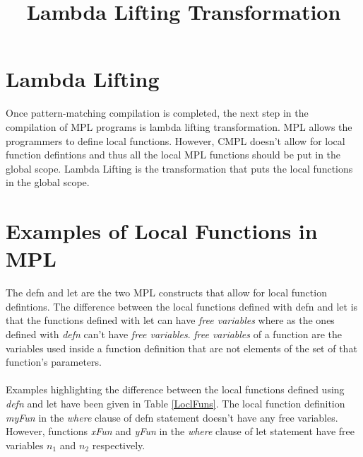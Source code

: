 \documentclass[11pt]{article}
\title{Lambda Lifting Transformation}
\begin{document}
\maketitle
\section {Lambda Lifting} 
Once pattern-matching compilation is completed, the next step in the compilation of MPL programs is lambda lifting transformation. MPL allows the programmers to define local functions. However, CMPL doesn't allow for local function defintions and thus all the local MPL functions should be put in the global scope. Lambda Lifting is the transformation that puts the local functions in the global scope.

\section {Examples of Local Functions in MPL}


The {\sf defn} and {\sf let} are the two MPL constructs that allow for local function defintions. The difference between the local functions defined with {\sf defn} and {\sf let} is that the functions defined with {\sf let} can have {\em free variables} where as the ones defined with {\em defn} can't have {\em free variables}. {\em free variables} of a function are the variables used inside a function definition that are not elements of the set of that function's parameters. 
~~\\~~\\ 
Examples highlighting the difference between the local functions defined using {\em defn} and {\sf let} have been given in Table \ref {LoclFuns}. The local function definition {\em myFun} in the {\em where} clause of {\sf defn} statement doesn't have any free variables. However, functions {\em xFun} and {\em yFun} in the {\em where} clause of {\sf let} statement have free variables $n_1$ and $n_2$ respectively.
\end{document}

